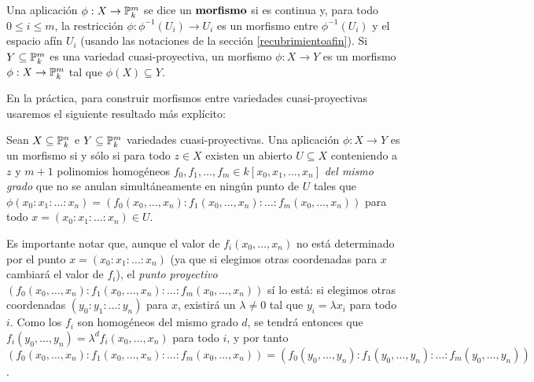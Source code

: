 \documentclass[ACGA.tex]{subfiles}
\begin{document}
\begin{defi}
 Una aplicación $\phi:X\to\mathbb{P}^m_k$ se dice un ${\bf morfismo}$ si es continua y, para todo $0\leq i\leq m$, la restricción $\phi:\phi^{-1}(U_i)\to U_i$ es un morfismo entre $\phi^{-1}(U_i)$ y el espacio afín $U_i$ (usando las notaciones de la sección \ref{recubrimientoafin}). Si $Y\subseteq\mathbb{P}^m_k$ es una variedad cuasi-proyectiva, un morfismo $\phi:X\to Y$ es un morfismo $\phi:X\to\mathbb{P}^m_k$ tal que $\phi(X)\subseteq Y$.
\end{defi}
 
En la práctica, para construir morfismos entre variedades cuasi-proyectivas usaremos el siguiente resultado más explícito:

\begin{prop}
 Sean $X\subseteq\mathbb{P}^n_k$ e $Y\subseteq\mathbb{P}^m_k$ variedades cuasi-proyectivas. Una aplicación $\phi:X\to Y$ es un morfismo si y sólo si para todo $z\in X$ existen un abierto $U\subseteq X$ conteniendo a $z$ y $m+1$ polinomios homogéneos $f_0,f_1,\ldots,f_m\in k[x_0,x_1,\ldots,x_n]$ \emph{del mismo grado} que no se anulan simultáneamente en ningún punto de $U$ tales que $\phi(x_0:x_1:\ldots:x_n)=(f_0(x_0,\ldots,x_n):f_1(x_0,\ldots,x_n):\ldots:f_m(x_0,\ldots,x_n))$ para todo $x=(x_0:x_1:\ldots:x_n)\in U$.
\end{prop}

Es importante notar que, aunque el valor de $f_i(x_0,\ldots,x_n)$ no está determinado por el punto $x=(x_0:x_1:\ldots:x_n)$ (ya que si elegimos otras coordenadas para $x$ cambiará el valor de $f_i$), el \emph{punto proyectivo} $(f_0(x_0,\ldots,x_n):f_1(x_0,\ldots,x_n):\ldots:f_m(x_0,\ldots,x_n))$ sí lo está: si elegimos otras coordenadas $(y_0:y_1:\ldots:y_n)$ para $x$, existirá un $\lambda\neq 0$ tal que $y_i=\lambda x_i$ para todo $i$. Como los $f_i$ son homogéneos del mismo grado $d$, se tendrá entonces que $f_i(y_0,\ldots,y_n)=\lambda^d f_i(x_0,\ldots,x_n)$ para todo $i$, y por tanto $(f_0(x_0,\ldots,x_n):f_1(x_0,\ldots,x_n):\ldots:f_m(x_0,\ldots,x_n))=(f_0(y_0,\ldots,y_n):f_1(y_0,\ldots,y_n):\ldots:f_m(y_0,\ldots,y_n))$.
\end{document}
